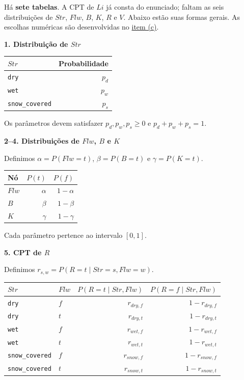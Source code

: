 \documentclass[11pt,a4paper]{article}
\newcommand{\subtitulo}[1]{\par\medskip\textbf{\textcolor{accent}{#1}}\par}
\begin{document}
Há \textbf{sete tabelas}. A CPT de \(Li\) já consta do enunciado; faltam as seis distribuições de \(Str\), \(Flw\), \(B\), \(K\), \(R\) e \(V\). Abaixo estão suas formas gerais. As escolhas numéricas são desenvolvidas no \hyperref[item-c]{item (c)}.

\subtitulo{\texorpdfstring{1. Distribuição de \(Str\)}{1. Distribuição de Str}}\label{distribuiuxe7uxe3o-de-str}

{\def\LTcaptype{none} %
\begin{longtable}[]{@{}lr@{}}
\toprule\noalign{}
\(Str\) & Probabilidade \\
\midrule\noalign{}
\endhead
\bottomrule\noalign{}
\endlastfoot
\texttt{dry} & \(p_d\) \\
\texttt{wet} & \(p_w\) \\
\texttt{snow\_covered} & \(p_s\) \\
\end{longtable}
}

Os parâmetros devem satisfazer \(p_d,p_w,p_s\geq 0\) e \(p_d+p_w+p_s=1\).

\subtitulo{\texorpdfstring{2--4. Distribuições de \(Flw\), \(B\) e \(K\)}{2--4. Distribuições de Flw, B e K}}\label{distribuiuxe7uxf5es-de-flw-b-e-k}

Definimos \(\alpha=P(Flw=t)\), \(\beta=P(B=t)\) e \(\gamma=P(K=t)\).

{\def\LTcaptype{none} %
\begin{longtable}[]{@{}lrr@{}}
\toprule\noalign{}
Nó & \(P(t)\) & \(P(f)\) \\
\midrule\noalign{}
\endhead
\bottomrule\noalign{}
\endlastfoot
\(Flw\) & \(\alpha\) & \(1-\alpha\) \\
\(B\) & \(\beta\) & \(1-\beta\) \\
\(K\) & \(\gamma\) & \(1-\gamma\) \\
\end{longtable}
}

Cada parâmetro pertence ao intervalo \([0,1]\).

\clearpage
\subtitulo{\texorpdfstring{5. CPT de \(R\)}{5. CPT de R}}\label{cpt-de-r}

Definimos \(r_{s,w}=P(R=t\mid Str=s,Flw=w)\).

{\def\LTcaptype{none} %
\begin{longtable}[]{@{}llrr@{}}
\toprule\noalign{}
\(Str\) & \(Flw\) & \(P(R=t\mid Str,Flw)\) & \(P(R=f\mid Str,Flw)\) \\
\midrule\noalign{}
\endhead
\bottomrule\noalign{}
\endlastfoot
\texttt{dry} & \(f\) & \(r_{dry,f}\) & \(1-r_{dry,f}\) \\
\texttt{dry} & \(t\) & \(r_{dry,t}\) & \(1-r_{dry,t}\) \\
\texttt{wet} & \(f\) & \(r_{wet,f}\) & \(1-r_{wet,f}\) \\
\texttt{wet} & \(t\) & \(r_{wet,t}\) & \(1-r_{wet,t}\) \\
\texttt{snow\_covered} & \(f\) & \(r_{snow,f}\) & \(1-r_{snow,f}\) \\
\texttt{snow\_covered} & \(t\) & \(r_{snow,t}\) & \(1-r_{snow,t}\) \\
\end{longtable}
}
\end{document}
